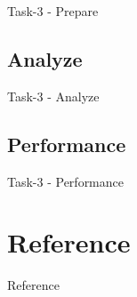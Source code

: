 \documentclass{beamer}
\begin{document}
\begin{frame}{Task-3 - Prepare}

\end{frame}

\subsection{Analyze}

\begin{frame}{Task-3 - Analyze}

\end{frame}

\subsection{Performance}

\begin{frame}{Task-3 - Performance}

\end{frame}

\section*{Reference}
\begin{frame}[allowframebreaks]{Reference}
  \printbibliography
\end{frame}

\appendix
\end{document}

